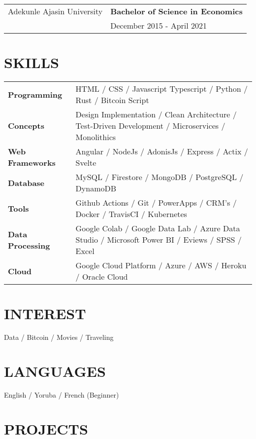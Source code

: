 \documentclass[a4paper,12pt]{article}
\begin{document}
\begin{tabularx}{\linewidth}{@{}l X@{}}
Adekunle Ajasin University & \textbf{Bachelor of Science in Economics} \\
                          & December 2015 - April 2021 \\[10pt]
\end{tabularx}

\section{SKILLS}

\begin{tabularx}{\linewidth}{@{}l X@{}}
\textbf{Programming} & HTML / CSS / Javascript Typescript / Python / Rust / Bitcoin Script \\
\textbf{Concepts} & Design Implementation / Clean Architecture / Test-Driven Development / Microservices / Monolithics \\
\textbf{Web Frameworks} & Angular / NodeJs / AdonisJs / Express / Actix / Svelte \\
\textbf{Database} & MySQL / Firestore / MongoDB / PostgreSQL / DynamoDB \\
\textbf{Tools} & Github Actions / Git / PowerApps / CRM's / Docker / TravisCI / Kubernetes \\
\textbf{Data Processing} & Google Colab / Google Data Lab / Azure Data Studio / Microsoft Power BI / Eviews / SPSS / Excel \\
\textbf{Cloud} & Google Cloud Platform / Azure / AWS / Heroku / Oracle Cloud
\end{tabularx}

\section{INTEREST}
Data / Bitcoin / Movies / Traveling

\section{LANGUAGES}
English / Yoruba / French (Beginner)

\section{PROJECTS}
\end{document}
